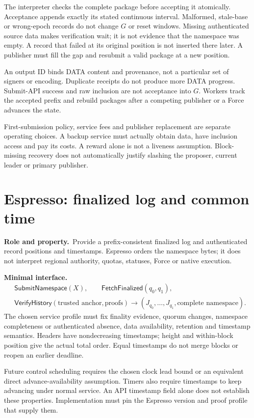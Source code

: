 \documentclass[11pt,a4paper]{article}
\newcommand{\api}[1]{\ensuremath{\mathsf{#1}}}
\newcommand{\role}{\textbf{Role and property.}\ }
\newcommand{\iface}{\textbf{Minimal interface.}\ }
\begin{document}
The interpreter checks the complete package before accepting it
atomically. Acceptance appends exactly its stated continuous interval.
Malformed, stale-base or wrong-epoch records do not change $G$ or reset
windows. Missing authenticated source data makes verification wait;
it is not evidence that the namespace was empty. A record that failed
at its original position is not inserted there later. A publisher must
fill the gap and resubmit a valid package at a new position.

An output ID binds DATA content and provenance, not a particular set of
signers or encoding. Duplicate receipts do not produce more DATA
progress. Submit-API success and raw inclusion are not acceptance into
$G$. Workers track the accepted prefix and rebuild packages after a
competing publisher or a Force advances the state.

First-submission policy, service fees and publisher replacement are
separate operating choices. A backup service must actually obtain data,
have inclusion access and pay its costs. A reward alone is not a liveness
assumption. Block-missing recovery does not automatically justify
slashing the proposer, current leader or primary publisher.

\section{Espresso: finalized log and common time}\label{sec:espresso}
\role Provide a prefix-consistent finalized log and authenticated
record positions and timestamps. Espresso orders the namespace bytes;
it does not interpret regional authority, quotas, statuses, Force or
native execution.

\iface
\[
\begin{aligned}
 &\api{SubmitNamespace}(X),\qquad
   \api{FetchFinalized}(q_0,q_1),\\
 &\api{VerifyHistory}(\text{trusted anchor},\text{proofs})
   \to (J_{q_0},\ldots,J_{q_1},\text{complete namespace}).
\end{aligned}
\]
The chosen service profile must fix finality evidence, quorum changes,
namespace completeness or authenticated absence, data availability,
retention and timestamp semantics. Headers have nondecreasing timestamps;
height and within-block position give the actual total order. Equal
timestamps do not merge blocks or reopen an earlier deadline.

Future control scheduling requires the chosen clock lead bound or an
equivalent direct advance-availability assumption. Timers also require
timestamps to keep advancing under normal service. An API timestamp
field alone does not establish these properties. Implementation must
pin the Espresso version and proof profile that supply them.
\end{document}
